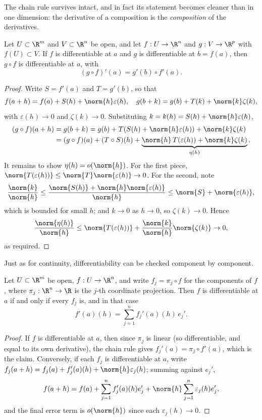 The chain rule survives intact, and in fact its statement becomes cleaner than in one dimension: the derivative of a composition is the \emph{composition} of the derivatives.

\begin{theorem}
    Let $U \subset \R^m$ and $V \subset \R^n$ be open, and let $f: U \rightarrow \R^n$ and $g: V \rightarrow \R^p$ with $f(U) \subset V$. If $f$ is differentiable at $a$ and $g$ is differentiable at $b = f(a)$, then $g \circ f$ is differentiable at $a$, with
    $$
    (g \circ f)'(a) = g'(b) \circ f'(a).
    $$
\end{theorem}
\begin{proof}
    Write $S = f'(a)$ and $T = g'(b)$, so that
    $$
    f(a + h) = f(a) + S(h) + \norm{h}\varepsilon(h), \quad g(b + k) = g(b) + T(k) + \norm{k}\zeta(k),
    $$
    with $\varepsilon(h) \rightarrow 0$ and $\zeta(k) \rightarrow 0$. Substituting $k = k(h) = S(h) + \norm{h}\varepsilon(h)$,
    \begin{align*}
        (g \circ f)(a + h) &= g(b + k) = g(b) + T(S(h) + \norm{h}\varepsilon(h)) + \norm{k}\zeta(k) \\
        &= (g \circ f)(a) + (T \circ S)(h) + \underbrace{\norm{h}\, T(\varepsilon(h)) + \norm{k} \zeta(k)}_{\eta(h)}.
    \end{align*}
    It remains to show $\eta(h) = o(\norm{h})$. For the first piece, $\norm{T(\varepsilon(h))} \leq \norm{T}\norm{\varepsilon(h)} \rightarrow 0$. For the second, note
    $$
    \frac{\norm{k}}{\norm{h}} \leq \frac{\norm{S(h)} + \norm{h}\norm{\varepsilon(h)}}{\norm{h}} \leq \norm{S} + \norm{\varepsilon(h)},
    $$
    which is bounded for small $h$; and $k \rightarrow 0$ as $h \rightarrow 0$, so $\zeta(k) \rightarrow 0$. Hence
    $$
    \frac{\norm{\eta(h)}}{\norm{h}} \leq \norm{T(\varepsilon(h))} + \frac{\norm{k}}{\norm{h}}\norm{\zeta(k)} \rightarrow 0,
    $$
    as required.
\end{proof}

Just as for continuity, differentiability can be checked component by component.

\begin{proposition}[Components]\label{prop:components}
    Let $U \subset \R^m$ be open, $f: U \rightarrow \R^n$, and write $f_j = \pi_j \circ f$ for the components of $f$, where $\pi_j: \R^n \rightarrow \R$ is the $j$-th coordinate projection. Then $f$ is differentiable at $a$ if and only if every $f_j$ is, and in that case
    $$
    f'(a)(h) = \sum_{j = 1}^n f_j'(a)(h) \, e_j'.
    $$
\end{proposition}
\begin{proof}
    If $f$ is differentiable at $a$, then since $\pi_j$ is linear (so differentiable, and equal to its own derivative), the chain rule gives $f_j'(a) = \pi_j \circ f'(a)$, which is the claim. Conversely, if each $f_j$ is differentiable at $a$, write $f_j(a + h) = f_j(a) + f_j'(a)(h) + \norm{h}\varepsilon_j(h)$; summing against $e_j'$,
    $$
    f(a + h) = f(a) + \sum_{j = 1}^n f_j'(a)(h)e_j' + \norm{h}\sum_{j = 1}^n \varepsilon_j(h) e_j',
    $$
    and the final error term is $o(\norm{h})$ since each $\varepsilon_j(h) \rightarrow 0$.
\end{proof}

